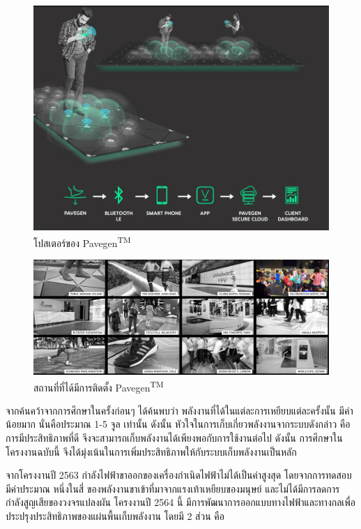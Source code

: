 \documentclass[11pt,a4paper]{article}
\begin{document}
\begin{figure}
    \centering
    \includegraphics[width=\textwidth]{pavegen_poster.jpg}
    \caption{โปสเตอร์ของ Pavegen\textsuperscript{TM}}
\end{figure}

\begin{figure}
    \centering
    \includegraphics[width=\textwidth]{pavegen_usecase.png}
    \caption{สถานที่ที่ได้มีการติดตั้ง Pavegen\textsuperscript{TM}}
\end{figure}

จากค้นคว้าจากการศึกษาในครั้งก่อนๆ \cite{biomech} \cite{GpH:01} ได้ค้นพบว่า พลังงานที่ได้ในแต่ละการเหยียบแต่ละครั้งนั้น มีค่าน้อยมาก นั่นคือประมาณ 1-5 จูล เท่านั้น ดังนั้น หัวใจในการเก็บเกี่ยวพลังงานจากระบบดังกล่าว คือการมีประสิทธิภาพที่ดี จึงจะสามารถเก็บพลังงานได้เพียงพอกับการใช้งานต่อไป ดังนั้น การศึกษาในโครงงานฉบับนี้ จึงได้มุ่งเน้นในการเพิ่มประสิทธิภาพให้กับระบบเก็บพลังงานเป็นหลัก

จากโครงงานปี 2563 กำลังไฟฟ้าขาออกของเครื่องกำเนิดไฟฟ้าไม่ได้เป็นค่าสูงสุด โดยจากการทดสอบมีค่าประมาณ หนึ่งในสี่ ของพลังงานขาเข้าที่มาจากแรงเท้าเหยียบของมนุษย์ และไม่ได้มีการลดการกำลังสูญเสียของวงจรแปลงผัน โครงงานปี 2564 นี้ มีการพัฒนาการออกแบบทางไฟฟ้าและทางกลเพื่อประปรุงประสิทธิภาพของแผ่นพื้นเก็บพลังงาน โดยมี 2 ส่วน คือ
\end{document}
